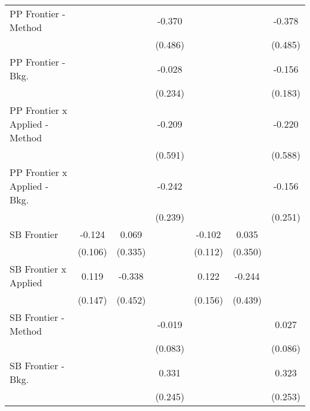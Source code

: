 \begin{tabular}{lcccccc}
   PP Frontier - Method           &              &               & -0.370        &              &               & -0.378\\   
                                  &              &               & (0.486)       &              &               & (0.485)\\   
   PP Frontier - Bkg.             &              &               & -0.028        &              &               & -0.156\\   
                                  &              &               & (0.234)       &              &               & (0.183)\\   
   PP Frontier x Applied - Method &              &               & -0.209        &              &               & -0.220\\   
                                  &              &               & (0.591)       &              &               & (0.588)\\   
   PP Frontier x Applied - Bkg.   &              &               & -0.242        &              &               & -0.156\\   
                                  &              &               & (0.239)       &              &               & (0.251)\\   
   SB Frontier                    & -0.124       & 0.069         &               & -0.102       & 0.035         &   \\   
                                  & (0.106)      & (0.335)       &               & (0.112)      & (0.350)       &   \\   
   SB Frontier x Applied          & 0.119        & -0.338        &               & 0.122        & -0.244        &   \\   
                                  & (0.147)      & (0.452)       &               & (0.156)      & (0.439)       &   \\   
   SB Frontier - Method           &              &               & -0.019        &              &               & 0.027\\   
                                  &              &               & (0.083)       &              &               & (0.086)\\   
   SB Frontier - Bkg.             &              &               & 0.331         &              &               & 0.323\\   
                                  &              &               & (0.245)       &              &               & (0.253)\\   

\end{tabular}
